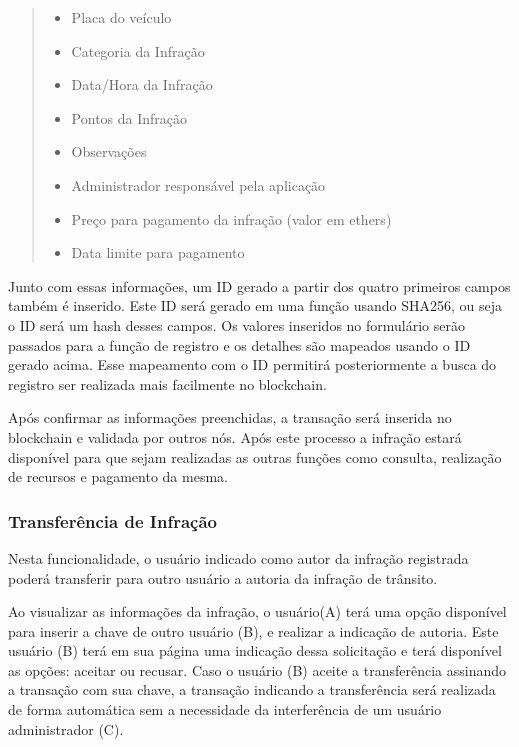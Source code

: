         \begin{quote}
        
            \begin{itemize}
                \item Placa do veículo
                \item Categoria da Infração
                \item Data/Hora da Infração
                \item Pontos da Infração
                \item Observações
                \item Administrador responsável pela aplicação
                \item Preço para pagamento da infração (valor em ethers)
                \item Data limite para pagamento
            \end{itemize}
            
        \end{quote}
        

    
        Junto com essas informações, um ID gerado a partir dos quatro primeiros campos também é inserido. Este ID será gerado em uma função usando SHA256, ou seja o ID será um hash desses campos. Os valores inseridos no formulário serão passados para a função de registro e os detalhes são mapeados usando o ID gerado acima. Esse mapeamento com o ID permitirá posteriormente a busca do registro ser realizada mais facilmente no blockchain.
        
        Após confirmar as informações preenchidas, a transação será inserida no blockchain e validada por outros nós. Após este processo a infração estará disponível para que sejam realizadas as outras funções como consulta, realização de recursos e pagamento da mesma.
        
            
    \subsubsection{Transferência de Infração}
    
        Nesta funcionalidade, o usuário indicado como autor da infração registrada poderá transferir para outro usuário a autoria da infração de trânsito.
        
        Ao visualizar as informações da infração, o usuário(A) terá uma opção disponível para inserir a chave de outro usuário (B), e realizar a indicação de autoria. Este usuário (B) terá em sua página uma indicação dessa solicitação e terá disponível as opções: aceitar ou recusar. Caso o usuário (B) aceite a transferência assinando a transação com sua chave, a transação indicando a transferência será realizada de forma automática sem a necessidade da interferência de um usuário administrador (C).
    
